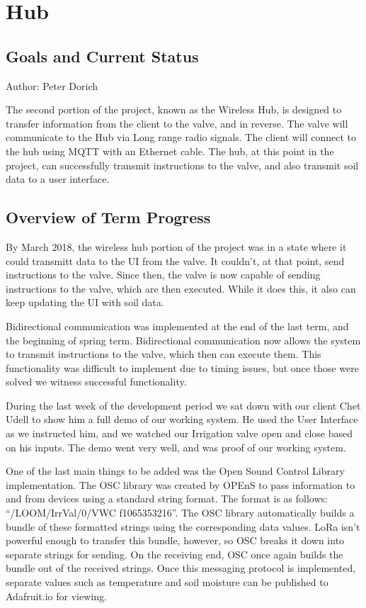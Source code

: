 \documentclass[onecolumn, draftclsnofoot,10pt, compsoc]{IEEEtran}
\begin{document}
    
    \section{Hub}
    \subsection{Goals and Current Status}
    Author: Peter Dorich
    
    
    The second portion of the project, known as the Wireless Hub, is designed to transfer information from the client to the valve, and in reverse.
    The valve will communicate to the Hub via Long range radio signals. 
    The client will connect to the hub using MQTT with an Ethernet cable.
    The hub, at this point in the project, can successfully transmit instructions to the valve, and also transmit soil data to a user interface. 
    
    \subsection{Overview of Term Progress}
    By March 2018, the wireless hub portion of the project was in a state where it could transmitt data to the UI from the valve.
    It couldn't, at that point, send instructions to the valve. 
   	Since then, the valve is now capable of sending instructions to the valve, which are then executed.
    While it does this, it also can keep updating the UI with soil data. 
   
	Bidirectional communication was implemented at the end of the last term, and the beginning of spring term. 
    Bidirectional communication now allows the system to transmit instructions to the valve, which then can execute them. 
    This functionality was difficult to implement due to timing issues, but once those were solved we witness successful functionality. 
    
    During the last week of the development period we sat down with our client Chet Udell to show him a full demo of our working system. 
    He used the User Interface as we instructed him, and we watched our Irrigation valve open and close based on his inputs.
    The demo went very well, and was proof of our working system. 
    
	One of the last main things to be added was the Open Sound Control Library implementation. 
    The OSC library was created by OPEnS to pass information to and from devices using a standard string format.
    The format is as follows: “/LOOM/IrrVal/0/VWC f1065353216”. 
    The OSC library automatically builds a bundle of these formatted strings using the corresponding data values.
    LoRa isn’t powerful enough to transfer this bundle, however, so OSC breaks it down into separate strings for sending. 
    On the receiving end, OSC once again builds the bundle out of the received strings. 
    Once this messaging protocol is implemented, separate values such as temperature and soil moisture can be published to Adafruit.io for viewing. 
    
\end{document}
